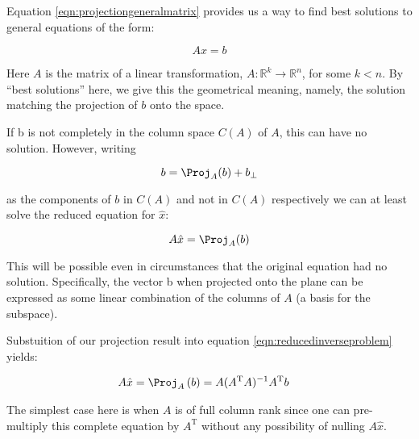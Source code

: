 \documentclass{article}      %
\newcommand{\T}[0]{\text{T}}
\begin{document}

%




Equation \ref{eqn:projectiongeneralmatrix} provides us a way to find best solutions to general equations of the form:


\[
A x = b
\]

Here $A$ is the matrix of a linear transformation, $A : \mathbb{R}^k \rightarrow \mathbb{R}^n$, for some $k<n$.
By ``best solutions'' here, we give this the geometrical meaning, namely, the solution matching the projection of $b$ onto the space.

If b is not completely in the column space $C(A)$ of $A$, this can have no solution.  However, writing

\[
b = \Proj_A(b) + b_\perp
\]

as the components of $b$ in $C(A)$ and not in $C(A)$ respectively we can at least solve the reduced equation for $\hat{x}$:


\begin{equation}\label{eqn:reducedinverseproblem}
A \hat{x} = \Proj_A(b)
\end{equation}


This will be possible even in circumstances that the original equation had no solution.  Specifically, the vector b when projected onto the plane can be expressed as some
linear combination of the columns of $A$ (a basis for the subspace).

Substuition of our projection result into equation \ref{eqn:reducedinverseproblem} yields:

\begin{align*}
A \hat{x} 
&= \Proj_{A}\left(b\right) = A (A^\T A)^{-1} A^\T b
\end{align*}

The simplest case here is when $A$ is of full column rank since one can pre-multiply this complete equation by $A^\T$ without any possibility of nulling
$A \hat{x}$.
\end{document}
